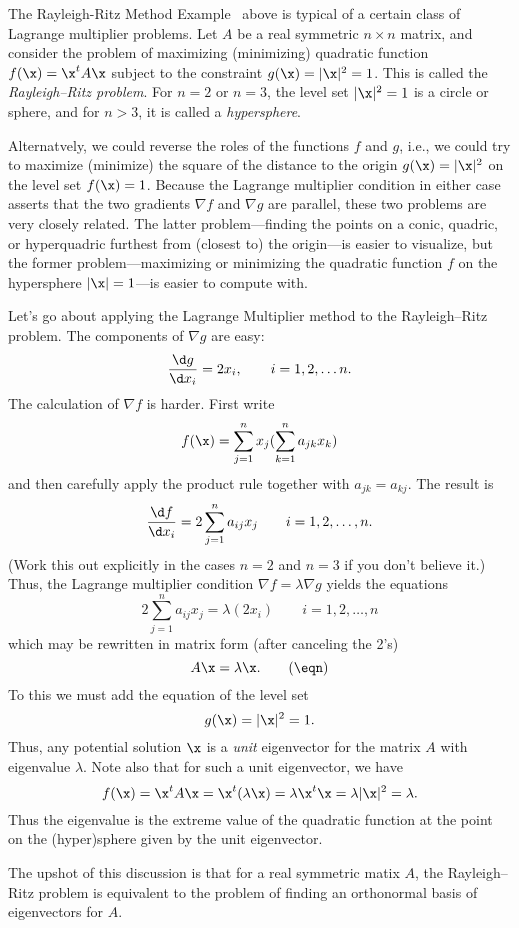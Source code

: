 \subhead The Rayleigh-Ritz Method \endsubhead
   Example \Eex\ above is typical of a certain class of
Lagrange multiplier problems.
Let  $A$ be
 a real symmetric $n\times n$ matrix, and consider the problem
of maximizing (minimizing)
  quadratic
function  $f(\x) = \x^tA\x$ subject to
the constraint $g(\x) = |\x|^2 = 1$.
This is called the {\it Rayleigh--Ritz problem}.
%
For $n = 2$ or $n = 3$, the level set $|\x|^2 = 1$ is a circle or
sphere, and for $n > 3$, it is called a {\it hypersphere}.

Alternatvely, we could reverse
the roles of the functions $f$ and $g$, i.e., we could try to maximize
(minimize)
the square of the distance to the origin
$g(\x) = |\x|^2$
on the level set
$f(\x) = 1$.
Because the Lagrange multiplier condition in either case asserts
that the two
gradients $\nabla f$ and $\nabla g$  are parallel,
these two problems are very closely related.
The latter problem---finding the points on a conic, quadric, or
hyperquadric furthest from (closest to) the origin---is easier
 to visualize, but the
former
 problem---maximizing or minimizing the quadratic function
 $f$ on the hypersphere $|\x| = 1$---is easier to compute with. 

Let's go about applying the Lagrange Multiplier
method to the Rayleigh--Ritz
problem.
The components
of $\nabla g$ are easy:
$$\frac{\d g}{\d x_i} =  2x_i,\qquad i = 1, 2, \dots n.$$
The calculation of $\nabla f$ is harder.   
First write
$$
f(\x) = \sum_{j=1}^nx_j(\sum_{k=1}^n a_{jk}x_k)
$$
and then carefully apply the product rule together with
$a_{jk} = a_{kj}$.   The result is
$$
\frac{\d f}{\d x_i} = 2\sum_{j=1}^n a_{ij}x_j\qquad i = 1, 2, \dots, n.
$$
(Work this out explicitly in the cases $n = 2$ and $n = 3$ if you
don't believe it.)
Thus, the Lagrange multiplier condition $\nabla f = \lambda \nabla g$
yields the equations
$$
2 \sum_{j=1}^n a_{ij}x_j = \lambda(2x_i)\qquad i = 1, 2, \dots, n
$$
which may be rewritten in matrix form (after canceling the 2's)
\nexteqn
$$
A\x = \lambda \x.\tag\eqn
$$
To this we must add the equation of the level set
$$
g(\x) = |\x|^2 = 1.
$$
Thus, any potential solution $\x$ is a {\it unit\/} eigenvector for the
matrix $A$ with eigenvalue $\lambda$.   
Note also that for such a unit eigenvector, we have
$$
f(\x) = \x^tA\x = \x^t(\lambda\x) = \lambda\x^t\x = \lambda|\x|^2 =
\lambda.
$$
Thus the eigenvalue is the extreme value of the quadratic function at the
point on the (hyper)sphere given by the unit eigenvector. 

The upshot of this discussion is that for a real symmetric matix
$A$, the Rayleigh--Ritz problem is equivalent to the problem
of finding an orthonormal basis of eigenvectors for $A$.


